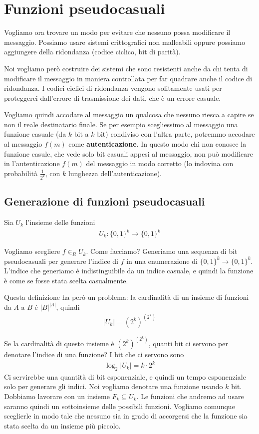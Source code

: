 \chapter{Funzioni pseudocasuali}
\label{chapter10}

Vogliamo ora trovare un modo per evitare che nessuno possa modificare il messaggio. Possiamo usare sistemi crittografici non malleabili oppure possiamo aggiungere della ridondanza (codice ciclico, bit di parità). 

Noi vogliamo però costruire dei sistemi che sono resistenti anche da chi tenta di modificare il messaggio in maniera controllata per far quadrare anche il codice di ridondanza. I codici ciclici di ridondanza vengono solitamente usati per proteggerci dall'errore di trasmissione dei dati, che è un errore casuale. 

Vogliamo quindi accodare al messaggio un qualcosa che nessuno riesca a capire se non il reale destinatario finale. Se per esempio scegliessimo al messaggio una funzione casuale (da $k$ bit a $k$ bit) condiviso con l'altra parte, potremmo accodare al messaggio $f(m)$ come \textbf{autenticazione}. In questo modo chi non conosce la funzione casule, che vede solo bit casuali appesi al messaggio, non può modificare in l'autenticazione $f(m)$ del messaggio in modo corretto (lo indovina con probabilità $\frac{1}{2^k}$, con $k$ lunghezza dell'autenticazione).

\section{Generazione di funzioni pseudocasuali}

Sia $U_k$ l'insieme delle funzioni 
\begin{align*}
    U_k: \{0, 1\}^k \rightarrow  \{0, 1\}^k
\end{align*}

\noindent Vogliamo scegliere $f \in_R U_k$. Come facciamo? Generiamo una sequenza di bit pseudocasuali per generare l'indice di $f$ in una enumerazione di $\{0, 1\}^k \rightarrow  \{0, 1\}^k$. L'indice che generiamo è indistinguibile da un indice casuale, e quindi la funzione è come se fosse stata scelta casualmente. 

Questa definizione ha però un problema: la cardinalità di un insieme di funzioni da $A$ a $B$ é $|B|^{|A|}$, quindi 
\begin{align*}
    |U_k| = (2^k)^{(2^k)}
\end{align*}

\noindent Se la cardinalità di questo insieme è $(2^k)^{(2^k)}$, quanti bit ci servono per denotare l'indice di una funzione? I bit che ci servono sono
\begin{align*}
    \log_2 |U_k| = k \cdot 2^k
\end{align*}
\noindent Ci servirebbe una quantità di bit esponenziale, e quindi un tempo esponenziale solo per generare gli indici. Noi vogliamo denotare una funzione usando $k$ bit. Dobbiamo lavorare con un insieme $F_k \subseteq U_k$. Le funzioni che andremo ad usare saranno quindi un sottoinsieme delle possibili funzioni. Vogliamo comunque sceglierle in modo tale che nessuno sia in grado di accorgersi che la funzione sia stata scelta da un insieme più piccolo. 

